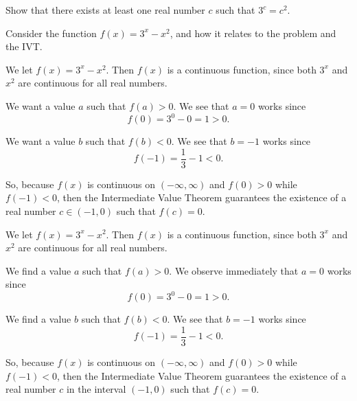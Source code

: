 \begin{question}[2015Q]
Show that there exists at least one real number $c$ such that
$3^c=c^2$.
\end{question}
\begin{hint} Consider the function $f(x)=3^x-x^2$, and how it relates to the problem and the IVT.
\end{hint}
\begin{answer} We let $f(x)=3^x-x^2$. Then $f(x)$ is a continuous function, since both $3^x$ and $x^2$ are continuous for all real numbers.

We want a value $a$ such that $f(a)>0$. We see that $a=0$ works since
$$f(0)=3^0-0=1>0.$$

We want a value $b$ such that $f(b)<0$. We see that
$b=-1$ works since
$$f(-1)=\frac{1}{3}-1<0.$$

So, because $f(x)$ is continuous on $(-\infty, \infty)$ and $f(0)>0$ while
$f(-1)<0$, then the Intermediate Value Theorem guarantees the existence of a
real number $c\in (-1,0)$ such that $f(c)=0$.
\end{answer}
\begin{solution}
We let $f(x)=3^x-x^2$. Then $f(x)$ is a continuous function, since both $3^x$ and $x^2$ are continuous for all real numbers.

We find a value $a$ such that $f(a)>0$. We observe
immediately that $a=0$ works since
$$f(0)=3^0-0=1>0.$$

We find a value $b$ such that $f(b)<0$. We see that
$b=-1$ works since
$$f(-1)=\frac{1}{3}-1<0.$$

So, because $f(x)$ is continuous on $(-\infty, \infty)$ and $f(0)>0$ while
$f(-1)<0$, then the Intermediate Value Theorem guarantees the existence of a
real number $c$ in the interval $(-1,0)$ such that $f(c)=0$.
\end{solution}



